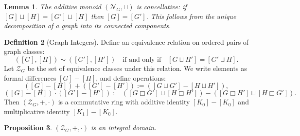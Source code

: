 \documentclass[11pt]{article}
\theoremstyle{definition}
\newtheorem{definition}{Definition}[section]
\theoremstyle{plain}
\newtheorem{proposition}[definition]{Proposition}
\newtheorem{lemma}[definition]{Lemma}
\theoremstyle{remark}
\begin{document}
\begin{lemma}
The additive monoid $(\mathcal{N}_G,\sqcup)$ is cancellative: if
$[G]\sqcup[H]=[G']\sqcup[H]$ then $[G]=[G']$.  This follows from the
unique decomposition of a graph into its connected components.
\end{lemma}

\begin{definition}[Graph Integers]
Define an equivalence relation on ordered pairs of graph classes:
\[
([G],[H]) \sim ([G'],[H']) \quad \text{if and only if} \quad [G \sqcup H'] = [G' \sqcup H].
\]
Let \(\mathcal{Z}_G\) be the set of equivalence classes under this relation. We write elements as formal differences \([G] - [H]\), and define operations:
\[
([G] - [H]) + ([G'] - [H']) := ([G \sqcup G'] - [H \sqcup H']),
\]
\[
([G] - [H]) \cdot ([G'] - [H']) := ([G \Box G'] \sqcup [H \Box H']) - ([G \Box H'] \sqcup [H \Box G']).
\]
Then \((\mathcal{Z}_G, +, \cdot)\) is a commutative ring with additive identity \([K_0] - [K_0]\) and multiplicative identity \([K_1] - [K_0]\).
\end{definition}

\begin{proposition}
\((\mathcal{Z}_G, +, \cdot)\) is an integral domain.
\end{proposition}
\end{document}
